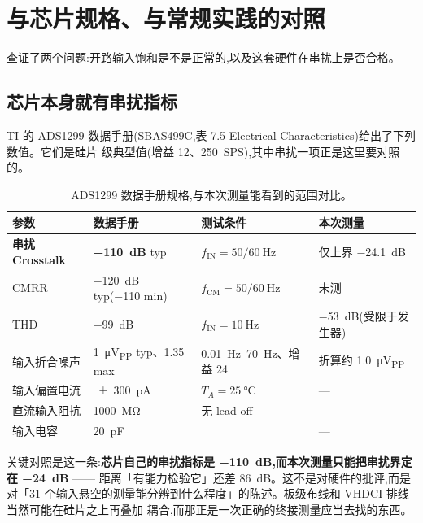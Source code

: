 \documentclass[11pt]{ctexart}
\begin{document}
\section{与芯片规格、与常规实践的对照}
\label{sec:lit}

查证了两个问题:开路输入饱和是不是正常的,以及这套硬件在串扰上是否合格。

\subsection*{芯片本身就有串扰指标}

TI 的 ADS1299 数据手册(SBAS499C,表 7.5 Electrical Characteristics)给出了下列数值。它们是硅片
级典型值(增益 12、\SI{250}{SPS}),其中串扰一项正是这里要对照的。

\begin{table}[h]\centering\small
\caption{ADS1299 数据手册规格,与本次测量能看到的范围对比。}
\begin{widetable}
\begin{tabular}{llll}
\toprule
参数 & 数据手册 & 测试条件 & 本次测量 \\
\midrule
\textbf{串扰 Crosstalk} & \textbf{\SI{-110}{\deci\bel}} typ & $f_{\text{IN}} = 50/\SI{60}{\hertz}$
  & 仅上界 \SI{-24.1}{\deci\bel} \\
CMRR & \SI{-120}{\deci\bel} typ(\SI{-110}{} min) & $f_{\text{CM}} = 50/\SI{60}{\hertz}$ & 未测 \\
THD & \SI{-99}{\deci\bel} & $f_{\text{IN}} = \SI{10}{\hertz}$ & \SI{-53}{\deci\bel}(受限于发生器) \\
输入折合噪声 & \SI{1}{\micro\volt}\textsubscript{PP} typ、\SI{1.35}{} max & \SIrange{0.01}{70}{\hertz}、增益 24
  & 折算约 \SI{1.0}{\micro\volt}\textsubscript{PP} \\
输入偏置电流 & \SI{\pm 300}{\pico\ampere} & $T_A = \SI{25}{\celsius}$ & --- \\
直流输入阻抗 & \SI{1000}{\mega\ohm} & 无 lead-off & --- \\
输入电容 & \SI{20}{\pico\farad} & & --- \\
\bottomrule
\end{tabular}
\end{widetable}
\end{table}

关键对照是这一条:\textbf{芯片自己的串扰指标是 \SI{-110}{\deci\bel},而本次测量只能把串扰界定在
\SI{-24}{\deci\bel}} —— 距离「有能力检验它」还差 \SI{86}{\deci\bel}。这不是对硬件的批评,而是
对「31 个输入悬空的测量能分辨到什么程度」的陈述。板级布线和 VHDCI 排线当然可能在硅片之上再叠加
耦合,而那正是一次正确的终接测量应当去找的东西。
\end{document}
